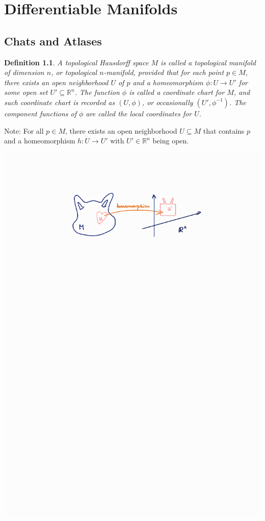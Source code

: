 \documentclass[11pt]{book}
\theoremstyle{break}
\theoremstyle{break}
\newtheorem{defn}{Definition}[corL]
\newcommand{\R}{\mathbb{R}}
\newcommand{\note}{\color{red}Note: \color{black}}
\begin{document}
\newpage 
\tableofcontents
{}

\newpage
\setcounter{page}{1}
\vspace*{\fill}


\newpage
\chapter{Differentiable Manifolds}
\section[Chats and Atlases]{\color{red}Chats and Atlases\color{black}}
\begin{defn}
A topological Hausdorff space $M$ is called a topological manifold of dimension $n$, or topological $n$-manifold, provided that for each point $p \in M$, there exists an open neighborhood $U$ of $p$ and a homeomorphism $\phi:U\to U'$ for some open set $U' \subseteq \R^n$. The function $\phi$ is called a coordinate chart for $M$, and such coordinate chart is recorded as $(U,\phi)$, or occasionally $(U', \phi^{-1})$. The component functions of $\phi$ are called the local coordinates for $U$. 
\end{defn}

\note For all $p \in M$, there exists an open neighborhood $U \subseteq M$ that contains $p$ and a homeomorphism $h:U \to U'$ with $U' \in \R^n$ being open.
\begin{center}
\includegraphics[scale=0.69]{topoMan}
\end{center}
\end{document}
